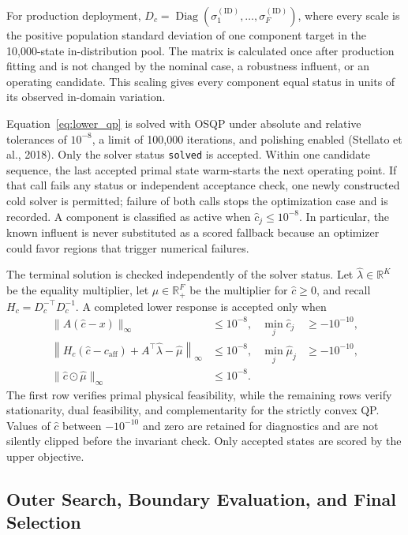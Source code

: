 \documentclass[a4paper,fleqn]{cas-sc}
\newcommand{\R}{\mathbb{R}}
\begin{document}
For production deployment, $D_c=\operatorname{Diag}(\sigma_1^{(\mathrm{ID})},\ldots,\sigma_F^{(\mathrm{ID})})$, where every scale is the positive population standard deviation of one component target in the 10,000-state in-distribution pool. The matrix is calculated once after production fitting and is not changed by the nominal case, a robustness influent, or an operating candidate. This scaling gives every component equal status in units of its observed in-domain variation.

Equation~\eqref{eq:lower_qp} is solved with OSQP under absolute and relative tolerances of $10^{-8}$, a limit of 100,000 iterations, and polishing enabled (Stellato et al., 2018). Only the solver status \texttt{solved} is accepted. Within one candidate sequence, the last accepted primal state warm-starts the next operating point. If that call fails any status or independent acceptance check, one newly constructed cold solver is permitted; failure of both calls stops the optimization case and is recorded. A component is classified as active when $\widehat c_j\leq10^{-8}$. In particular, the known influent is never substituted as a scored fallback because an optimizer could favor regions that trigger numerical failures.

The terminal solution is checked independently of the solver status. Let $\widehat\lambda\in\R^K$ be the equality multiplier, let $\widehat\mu\in\R_+^F$ be the multiplier for $\widehat c\geq0$, and recall $H_c=D_c^{-\top}D_c^{-1}$. A completed lower response is accepted only when
\begin{equation}
\label{eq:lower_acceptance}
\begin{aligned}
\|A(\widehat c-x)\|_\infty&\leq10^{-8},
&\min_j\widehat c_j&\geq-10^{-10},\\
\left\|H_c(\widehat c-c_{\mathrm{aff}})
+A^\top\widehat\lambda-\widehat\mu\right\|_\infty&\leq10^{-8},
&\min_j\widehat\mu_j&\geq-10^{-10},\\
\|\widehat c\odot\widehat\mu\|_\infty&\leq10^{-8}.&&
\end{aligned}
\end{equation}
The first row verifies primal physical feasibility, while the remaining rows verify stationarity, dual feasibility, and complementarity for the strictly convex QP. Values of $\widehat c$ between $-10^{-10}$ and zero are retained for diagnostics and are not silently clipped before the invariant check. Only accepted states are scored by the upper objective.

\subsection{Outer Search, Boundary Evaluation, and Final Selection}
\end{document}
